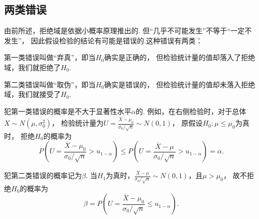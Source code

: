 \subsection{两类错误}
由前所述，拒绝域是依据小概率原理推出的.
但“几乎不可能发生”不等于“一定不发生”，
因此假设检验的结论有可能是错误的.这种错误有两类：

第一类错误叫做“弃真”，即当\(H_0\)确实是正确的，
但检验统计量的值却落入了拒绝域，我们就拒绝了\(H_0\).

第二类错误叫做“取伪”，即当\(H_0\)确实是错误的，
但检验统计量的值却未落入拒绝域，我们就接受了\(H_0\).

犯第一类错误的概率是不大于显著性水平\(\alpha\)的.
例如，在右侧检验时，对于总体\(X \sim N(\mu,\sigma_0^2)\)，
检验统计量为\(U = \frac{\overline{X}-\mu_0}{\sigma_0 / \sqrt{n}} \sim N(0,1)\)，
原假设\(H_0: \mu\leq\mu_0\)为真时，
拒绝\(H_0\)的概率为\[
	P\left(U=\frac{\overline{X}-\mu_0}{\sigma_0 / \sqrt{n}}>u_{1-\alpha}\right)
	\leq P\left(U=\frac{\overline{X}-\mu}{\sigma_0 / \sqrt{n}}>u_{1-\alpha}\right)
	= \alpha.
\]

犯第二类错误的概率记为\(\beta\).
当\(H_1\)为真时，\(\frac{\overline{X}-\mu}{\sigma_0/\sqrt{n}} \sim N(0,1)\)，且\(\mu>\mu_0\)，
故不拒绝\(H_0\)的概率为\[
	\beta=P\left(U=\frac{\overline{X}-\mu_0}{\sigma_0/\sqrt{n}} \leq u_{1-\alpha}\right).
\]
